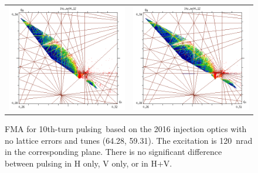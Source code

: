 \documentclass[aps
,prstab
,reprint
,longbibliography
,preprintnumbers
,showkeys
,amsfonts,amssymb,amsmath
,floatfix
]{revtex4-1}
\newcommand{\tenthtp}{10th-turn pulsing}
\newlength{\fmawidth}
\newlength{\smallfmawidth}
\begin{document}
\begin{figure}
\begin{tabular}{cc}
    \includegraphics[width=\smallfmawidth]{2016injnocolc15o+19_6noerrut10skh_dp0_ord10.png} &
    \includegraphics[width=\smallfmawidth]{2016injnocolc15o+19_6noerrut10skv_dp0_ord10.png} \\
  \end{tabular}
  \caption{FMA for \tenthtp\ based on the 2016 injection
    optics with no lattice errors and tunes (64.28, 59.31). The
    excitation is 120~nrad in the corresponding plane. There is no
    significant difference between pulsing in H only, V only, or in H+V.}
  \label{fig:fma:10}
\end{figure}
\end{document}
